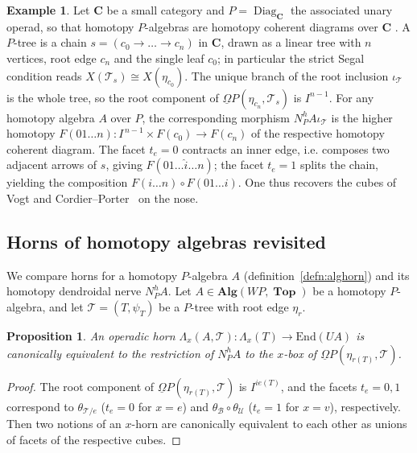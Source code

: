 \documentclass{amsart}
\newtheorem{proposition}[formula]{Proposition}
\theoremstyle{definition}
\newtheorem{example}[formula]{Example}
\theoremstyle{remark}
\newcommand{\Cc}{\mathbf{C}}
\DeclareMathOperator{\Top}{\mathbf{Top}}
\DeclareMathOperator{\Diag}{Diag}
\begin{document}
	\begin{example}\label{ex:diag}
		Let $\Cc$ be a small category and $P=\Diag_{\Cc}$ the associated unary operad, so that
		homotopy $P$-algebras are homotopy coherent diagrams over $\Cc$ \cite{be-mo-06}. 
		A $P$-tree is a chain $s=(c_0\to\dots\to c_n)$ in $\Cc$, drawn as a linear tree with
		$n$ vertices, root edge $c_n$ and the single leaf $c_0$; in particular the strict
		Segal condition reads $X(\mathcal{T}_{s})\cong X(\eta_{c_{0}})$.
		The unique branch of the
		root inclusion $\iota_{\mathcal{T}}$ is the whole tree, so the root component of $\underline\Omega P(\eta_{c_n},\mathcal T_s)$ is $I^{n-1}$.
		For any homotopy algebra $A$ over $P$, the corresponding morphism $N^h_PA \iota_{\mathcal{T}}$ is the higher homotopy
		$F(01\dots n)\colon I^{\,n-1}\times F(c_0)\to F(c_n)$ of the respective homotopy coherent diagram. 
		The facet $t_e=0$ contracts
		an inner edge, i.e. composes two adjacent arrows of $s$, giving
		$F(01\dots\hat{i}\dots n)$; the facet $t_e=1$ splits the chain, yielding the composition
		$F(i\dots n)\circ F(01\dots i)$. 
		One thus recovers the cubes of Vogt and
		Cordier--Porter~\cite{co-po-86} on the nose.
	\end{example}
	
	\subsection{Horns of homotopy algebras revisited}\label{ssec:comphorns}	
	We compare horns for a homotopy $P$-algebra $A$ (definition~\ref{defn:alghorn}) and its homotopy dendroidal nerve $N_P^h A$. 
	Let $A \in \mathbf{Alg}(W P, \Top)$ be a homotopy $P$-algebra, and let $\mathcal{T} = (T, \psi_{T})$ be a $P$-tree with root edge $\eta_r$. 
	
	\begin{proposition}\label{pr:horncorr}
		An operadic horn $\Lambda_x(A, \mathcal{T}): \Lambda_x(T) \to \mathrm{End}(UA)$ is canonically equivalent to the restriction of $N^{h}_{P} A$ to the $x$-box of $\underline{\Omega} P(\eta_{r(T)},\mathcal{T})$.
	\end{proposition}
	\begin{proof}
		The root component of $\underline{\Omega} P(\eta_{r(T)},\mathcal{T})$ is $I^{ie(T)}$, and the facets $t_{e}=0,1$ correspond to $\theta_{\mathcal{T}/e}$ ($t_{e}=0$ for $x=e$) and $\theta_{\mathcal{B}}\circ\theta_{\mathcal{U}}$ ($t_{e}=1$ for $x=v$), respectively.
		Then two notions of an $x$-horn are canonically equivalent to each other as unions of facets of the respective cubes.
	\end{proof}
\end{document}
